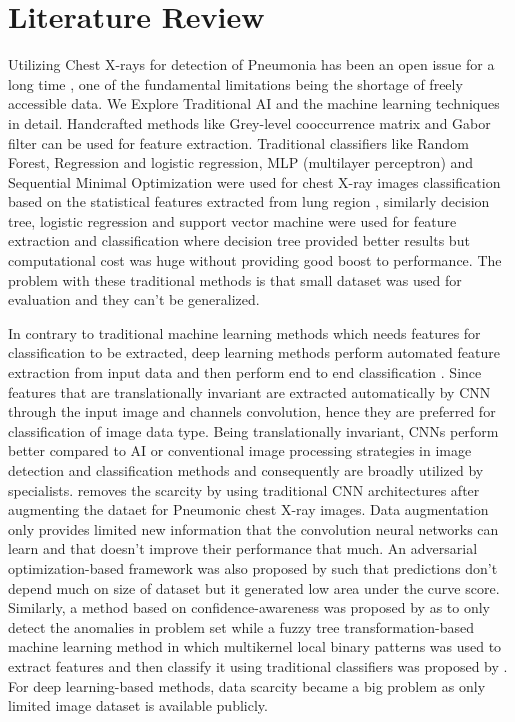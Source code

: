\documentclass{ieeeaccess}
\begin{document}
\section{Literature Review}
Utilizing Chest X-rays for detection of Pneumonia has been an open issue for a long time \cite{b9, b15}, one of the fundamental limitations being the shortage of freely accessible data. We Explore Traditional AI and the machine learning techniques in detail. Handcrafted methods like Grey-level cooccurrence matrix and Gabor filter can be used for feature extraction. Traditional classifiers like Random Forest, Regression and logistic regression, MLP (multilayer perceptron) and Sequential Minimal Optimization were used for chest X-ray images classification based on the statistical features extracted from lung region \cite{b16}, similarly decision tree, logistic regression and support vector machine were used for feature extraction and classification where decision tree provided better results \cite{b17, b18} but computational cost was huge without providing good boost to performance. The problem with these traditional methods is that small dataset was used for evaluation and they can't be generalized.

In contrary to traditional machine learning methods which needs features for classification to be extracted, deep learning methods perform automated feature extraction from input data and then perform end to end classification \cite{b29, b30}. Since features that are translationally invariant are extracted automatically by CNN through the input image and channels convolution, hence they are preferred for classification of image data type. Being translationally invariant, CNNs perform better compared to AI or conventional image processing strategies in image detection and classification methods and consequently are broadly utilized by specialists. \cite{b19,b20} removes the scarcity by using traditional CNN architectures after augmenting the dataet for Pneumonic chest X-ray images.
Data augmentation only provides limited new information that the convolution neural networks can learn and that doesn’t improve their performance that much. An adversarial optimization-based framework was also proposed by \cite{b22} such that predictions don’t depend much on size of dataset but it generated low area under the curve score. Similarly, a method based on confidence-awareness was proposed by \cite{b22} as to only detect the anomalies in problem set while a fuzzy tree transformation-based machine learning method in which multikernel local binary patterns was used to extract features and then classify it using traditional classifiers was proposed by \cite{b23}. For deep learning-based methods, data scarcity became a big problem as only limited image dataset is available publicly. 
\end{document}
